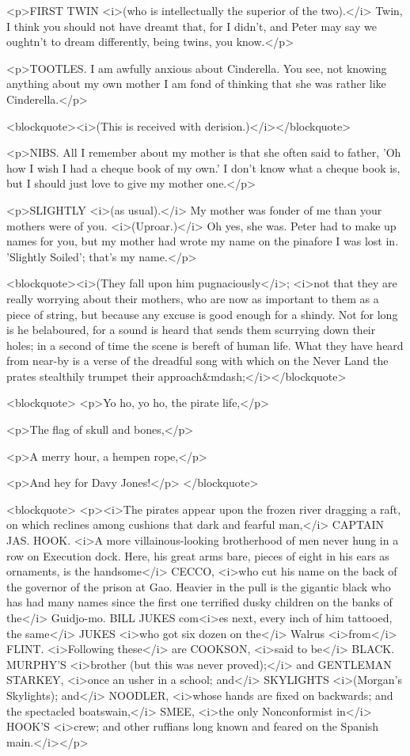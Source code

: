 <p>FIRST TWIN <i>(who is intellectually the superior of the two).</i>
Twin, I think you should not have dreamt that, for I didn't, and
Peter may say we oughtn't to dream differently, being twins, you
know.</p>

<p>TOOTLES. I am awfully anxious about Cinderella. You see, not
knowing anything about my own mother I am fond of thinking that she
was rather like Cinderella.</p>

<blockquote><i>(This is received with derision.)</i></blockquote>

<p>NIBS. All I remember about my mother is that she often said to
father, 'Oh how I wish I had a cheque book of my own.' I don't know
what a cheque book is, but I should just love to give my mother
one.</p>

<p>SLIGHTLY <i>(as usual).</i> My mother was fonder of me than your
mothers were of you. <i>(Uproar.)</i> Oh yes, she was. Peter had to
make up names for you, but my mother had wrote my name on the
pinafore I was lost in. 'Slightly Soiled'; that's my name.</p>

<blockquote><i>(They fall upon him pugnaciously</i>; <i>not that they
are really worrying about their mothers, who are now as important to
them as a piece of string, but because any excuse is good enough for
a shindy. Not for long is he belaboured, for a sound is heard that
sends them scurrying down their holes; in a second of time the scene
is bereft of human life. What they have heard from near-by is a verse
of the dreadful song with which on the Never Land the prates
stealthily trumpet their approach&mdash;</i></blockquote>

<blockquote>
<p>Yo ho, yo ho, the pirate life,</p>

<p>The flag of skull and bones,</p>

<p>A merry hour, a hempen rope,</p>

<p>And hey for Davy Jones!</p>
</blockquote>

<blockquote>
<p><i>The pirates appear upon the frozen river dragging a raft, on
which reclines among cushions that dark and fearful man,</i> CAPTAIN
JAS. HOOK. <i>A more villainous-looking brotherhood of men never hung
in a row on Execution dock. Here, his great arms bare, pieces of
eight in his ears as ornaments, is the handsome</i> CECCO, <i>who cut
his name on the back of the governor of the prison at Gao. Heavier in
the pull is the gigantic black who has had many names since the first
one terrified dusky children on the banks of the</i> Guidjo-mo. BILL
JUKES com<i>es next, every inch of him tattooed, the same</i> JUKES
<i>who got six dozen on the</i> Walrus <i>from</i> FLINT.
<i>Following these</i> are COOKSON, <i>said to be</i> BLACK. MURPHY'S
<i>brother (but this was never proved);</i> and GENTLEMAN STARKEY,
<i>once an usher in a school; and</i> SKYLIGHTS <i>(Morgan's
Skylights); and</i> NOODLER, <i>whose hands are fixed on backwards;
and the spectacled boatswain,</i> SMEE, <i>the only Nonconformist
in</i> HOOK'S <i>crew; and other ruffians long known and feared on
the Spanish main.</i></p>

